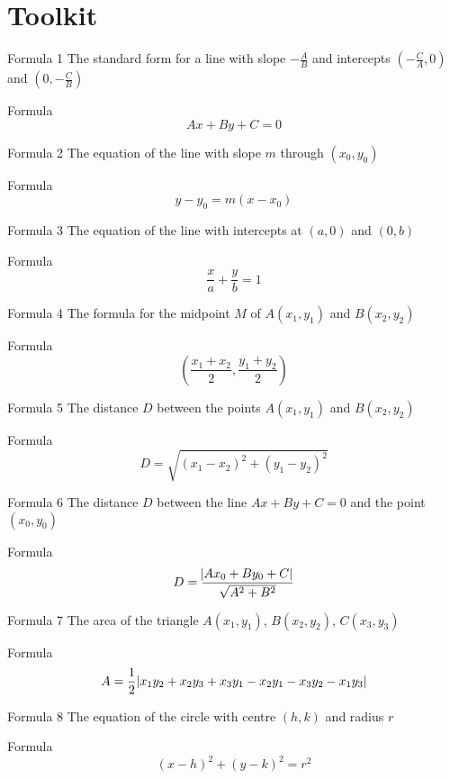 \section{Toolkit}
\begin{namedframe}{Formula 1}
	The standard form for a line with slope $-\frac{A}{B}$ and intercepts $\left( -\frac{C}{A}, 0 \right)$ and $\left( 0, -\frac{C}{B} \right)$
	\begin{block}{Formula}
		\[Ax + By + C = 0\]
	\end{block}
\end{namedframe}
\begin{namedframe}{Formula 2}
	The equation of the line with slope $m$ through $(x_0, y_0)$
	\begin{block}{Formula}
		\[y - y_0 = m(x - x_0)\]
	\end{block}
\end{namedframe}
\begin{namedframe}{Formula 3}
	The equation of the line with intercepts at $(a, 0)$ and $(0, b)$
	\begin{block}{Formula}
		\[\frac{x}{a} + \frac{y}{b} = 1\]
	\end{block}
\end{namedframe}
\begin{namedframe}{Formula 4}
	The formula for the midpoint $M$ of $A(x_1, y_1)$ and $B(x_2, y_2)$
	\begin{block}{Formula}
		\[\left( \frac{x_1 + x_2}{2} , \frac{y_1 + y_2}{2} \right)\]
	\end{block}
\end{namedframe}
\begin{namedframe}{Formula 5}
	The distance $D$ between the points $A(x_1, y_1)$ and $B(x_2, y_2)$
	\begin{block}{Formula}
		\[D = \sqrt{ (x_1 - x_2)^2 + (y_1 - y_2)^2 }\]
	\end{block}
\end{namedframe}
\begin{namedframe}{Formula 6}
	The distance $D$ between the line $Ax + By + C = 0$ and the point $(x_0, y_0)$
	\begin{block}{Formula}
		\[D = \frac{\abs{Ax_0 + By_0 + C}}{\sqrt{A^2 + B^2}}\]
	\end{block}
\end{namedframe}
\begin{namedframe}{Formula 7}
	The area of the triangle $A(x_1, y_1)$, $B(x_2, y_2)$, $C(x_3, y_3)$
	\begin{block}{Formula}
		\[A = \frac{1}{2}\abs{x_1y_2 + x_2y_3 + x_3y_1 - x_2y_1 - x_3y_2 - x_1y_3}\]
	\end{block}
\end{namedframe}
\begin{namedframe}{Formula 8}
	The equation of the circle with centre $(h, k)$ and radius $r$
	\begin{block}{Formula}
		\[(x-h)^2 + (y-k)^2 = r^2\]
	\end{block}
\end{namedframe}
